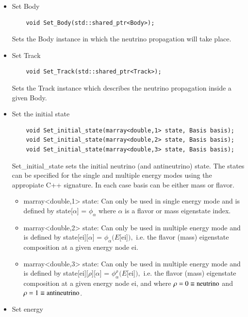\documentclass[3p,12pt]{elsarticle}
\newcommand{\ttf}{\ttfamily}
\begin{document}
\begin{itemize}
  \item Set {\ttfamily Body}
  \begin{lstlisting}
    void Set_Body(std::shared_ptr<Body>);
  \end{lstlisting}
  Sets the {\ttf Body} instance in which the neutrino propagation will take place.
  \item Set {\ttfamily Track}
  \begin{lstlisting}
    void Set_Track(std::shared_ptr<Track>);
  \end{lstlisting}
  Sets the {\ttf Track} instance which describes the neutrino propagation inside a
  given {\ttf Body}.
  \item Set the initial state
  \begin{lstlisting}
    void Set_initial_state(marray<double,1> state, Basis basis);
    void Set_initial_state(marray<double,2> state, Basis basis);
    void Set_initial_state(marray<double,3> state, Basis basis);
  \end{lstlisting}
  {\ttf Set\_initial\_state} sets the initial neutrino (and
  antineutrino) state. The states  can be specified for the single and
  multiple energy modes using the appropiate {\ttf
    C++} signature. In each case {\ttf basis} can be either {\ttf
    mass} or {\ttf flavor}. 
  \begin{itemize}
  	\item {\ttf marray<double,1> state}: 
	Can only be used in single energy mode and is defined by 
	{\ttf state[$\alpha$]  = $\phi_\alpha$ } where $\alpha$ is a
        flavor or mass eigenstate index. 
	\item {\ttf marray<double,2> state}: Can only be used in
          multiple energy mode and is defined by {\ttf
            state[ei][$\alpha$]  = $\phi_\alpha (E$[ei]$),$ } i.e. the
          flavor (mass) eigenstate composition at a given energy node
          {\ttf ei}. 
	\item {\ttf marray<double,3> state}: Can only be used in
          multiple energy mode and is defined by {\ttf
            state[ei][$\rho$][$\alpha$]  = $\phi^{\rho}_\alpha
            (E$[ei]$),$ } i.e. the flavor (mass) eigenstate
          composition at a given energy node {\ttf ei}, and where
          $\rho = 0 \equiv {\rm neutrino}$ and $\rho = 1 \equiv {\rm
            antineutrino}$. 
  \end{itemize}
  \item Set energy
  \begin{lstlisting}

\end{lstlisting}
\end{itemize}
\end{document}
